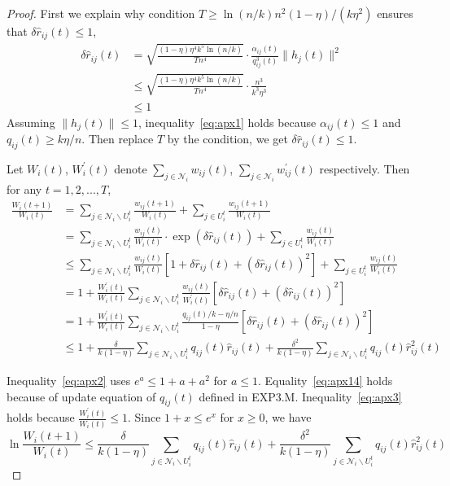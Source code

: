 \documentclass{article}
\begin{document}
\begin{proof}
First we explain why condition $T\geq \ln(n/k)n^2(1-\eta)/(k\eta^2)$ ensures that $\delta\hat{r}_{ij}(t)\leq 1$,
{\footnotesize
\begin{align}
	\delta\hat{r}_{ij}(t) &= \sqrt{\frac{(1-\eta)\eta^4 k^5 \ln(n/k)}{T n^4}}\cdot\frac{\alpha_{ij}(t)}{q_{ij}^3(t)}\|h_{j}(t)\|^2 \\
	&\leq \sqrt{\frac{(1-\eta)\eta^4k^5\ln(n/k)}{Tn^4}}\cdot\frac{n^3}{k^3\eta^3} \label{eq:apx1} \\
	&\leq 1
\end{align}
}
Assuming $\|h_{j}(t)\|\leq 1$, inequality~\eqref{eq:apx1} holds because $\alpha_{ij}(t)\leq 1$ and $q_{ij}(t)\geq k\eta/n$. Then replace $T$ by the condition, we get $\delta\hat{r}_{ij}(t)\leq 1$.

Let $W_i(t)$, $W_i^{\prime}(t)$ denote $\sum_{j\in\mathcal{N}_i}w_{ij}(t)$, $\sum_{j\in\mathcal{N}_i}w_{ij}^{\prime}(t)$ respectively. Then for any $t=1,2,...,T$,
{\footnotesize
\begin{align}
\frac{W_i(t+1)}{W_i(t)} &= \sum_{j\in\mathcal{N}_i\backslash U_i^t}\frac{w_{ij}(t+1)}{W_{i}(t)} + \sum_{j\in U_i^t}\frac{w_{ij}(t+1)}{W_{i}(t)} \\ 
&= \sum_{j\in\mathcal{N}_i\backslash U_i^t}\frac{w_{ij}(t)}{W_{i}(t)}\cdot\exp(\delta\hat{r}_{ij}(t)) + \sum_{j\in U_i^t}\frac{w_{ij}(t)}{W_{i}(t)} \\
&\leq \sum_{j\in\mathcal{N}_i\backslash U_i^t}\frac{w_{ij}(t)}{W_{i}(t)}\left[1 + \delta\hat{r}_{ij}(t) + \left(\delta\hat{r}_{ij}(t)\right)^2\right] + \sum_{j\in U_i^t}\frac{w_{ij}(t)}{W_{i}(t)} \label{eq:apx2} \\
&= 1 + \frac{W_i^{\prime}(t)}{W_i(t)}\sum_{j\in\mathcal{N}_i\backslash U_i^t}\frac{w_{ij}(t)}{W_i^{\prime}(t)}\left[\delta\hat{r}_{ij}(t) +  \left(\delta\hat{r}_{ij}(t)\right)^2\right] \\
&= 1 + \frac{W_i^{\prime}(t)}{W_i(t)}\sum_{j\in\mathcal{N}_i\backslash U_i^t}\frac{q_{ij}(t)/k - \eta/n}{1-\eta}\left[\delta\hat{r}_{ij}(t) +  \left(\delta\hat{r}_{ij}(t)\right)^2\right] \label{eq:apx14} \\
&\leq 1 + \frac{\delta}{k(1-\eta)}\sum_{j\in\mathcal{N}_i\backslash U_i^t}q_{ij}(t)\hat{r}_{ij}(t) + \frac{\delta^2}{k(1-\eta)}\sum_{j\in\mathcal{N}_i\backslash U_i^t}q_{ij}(t)\hat{r}_{ij}^2(t) \label{eq:apx3}
\end{align}
}

Inequality~\eqref{eq:apx2} uses $e^a\leq 1+a+a^2$ for $a\leq 1$. Equality~\eqref{eq:apx14} holds because of update equation of $q_{ij}(t)$ defined in EXP3.M. Inequality~\eqref{eq:apx3} holds because $\frac{W_i^{\prime}(t)}{W_i(t)}\leq 1$. Since $1+x\leq e^x$ for $x\geq 0$, we have
{\footnotesize
\begin{equation}
	\ln\frac{W_i(t+1)}{W_i(t)} \leq \frac{\delta}{k(1-\eta)}\sum_{j\in\mathcal{N}_i\backslash U_i^t}q_{ij}(t)\hat{r}_{ij}(t) + \frac{\delta^2}{k(1-\eta)}\sum_{j\in\mathcal{N}_i\backslash U_i^t}q_{ij}(t)\hat{r}_{ij}^2(t)
\end{equation}
}


\end{proof}
\end{document}
